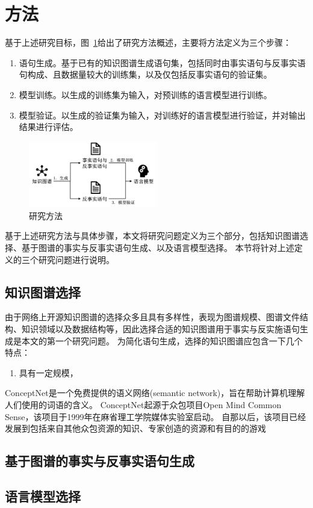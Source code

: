 \section{方法}
基于上述研究目标，图~\ref{fig:研究方法}给出了研究方法概述，主要将方法定义为三个步骤：

\begin{enumerate}
    \item 语句生成。基于已有的知识图谱生成语句集，包括同时由事实语句与反事实语句构成、且数据量较大的训练集，以及仅包括反事实语句的验证集。
    \item 模型训练。以生成的训练集为输入，对预训练的语言模型进行训练。
    \item 模型验证。以生成的验证集为输入，对训练好的语言模型进行验证，并对输出结果进行评估。
\end{enumerate}

\begin{figure}[htb]
    \centering
    \includegraphics[width=0.5\textwidth]{images/研究方法.png}
    \caption[研究方法]{研究方法}
    \label{fig:研究方法}
\end{figure}

基于上述研究方法与具体步骤，本文将研究问题定义为三个部分，包括知识图谱选择、基于图谱的事实与反事实语句生成、以及语言模型选择。
本节将针对上述定义的三个研究问题进行说明。

\subsection{知识图谱选择}
由于网络上开源知识图谱的选择众多且具有多样性，表现为图谱规模、图谱文件结构、知识领域以及数据结构等，因此选择合适的知识图谱用于事实与反实施语句生成是本文的第一个研究问题。
为简化语句生成，选择的知识图谱应包含一下几个特点：
\begin{enumerate}
    \item 具有一定规模，
\end{enumerate}

ConceptNet是一个免费提供的语义网络(semantic network)，旨在帮助计算机理解人们使用的词语的含义。
ConceptNet起源于众包项目Open Mind Common Sense，该项目于1999年在麻省理工学院媒体实验室启动。
自那以后，该项目已经发展到包括来自其他众包资源的知识、专家创造的资源和有目的的游戏

\subsection{基于图谱的事实与反事实语句生成}


\subsection{语言模型选择}

